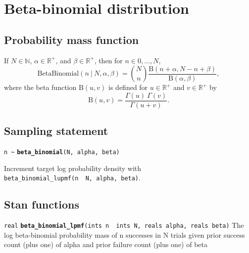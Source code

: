 \documentclass[
  10pt,
]{book}
\begin{document}
\hypertarget{beta-binomial-distribution}{%
\section{Beta-binomial distribution}\label{beta-binomial-distribution}}

\hypertarget{probability-mass-function-5}{%
\subsection{Probability mass function}\label{probability-mass-function-5}}

If \(N \in \mathbb{N}\), \(\alpha \in \mathbb{R}^+\), and \(\beta \in \mathbb{R}^+\), then for \(n \in {0,\ldots,N}\), \[
\text{BetaBinomial}(n~|~N,\alpha,\beta) = \binom{N}{n}
\frac{\mathrm{B}(n+\alpha, N -n +   \beta)}{\mathrm{B}(\alpha,\beta)},
\] where the beta function \(\mathrm{B}(u,v)\) is defined for \(u \in \mathbb{R}^+\) and \(v \in \mathbb{R}^+\) by \[ \mathrm{B}(u,v) =
\frac{\Gamma(u) \ \Gamma(v)}{\Gamma(u + v)}. \]

\hypertarget{sampling-statement-5}{%
\subsection{Sampling statement}\label{sampling-statement-5}}

\texttt{n\ \textasciitilde{}} \textbf{\texttt{beta\_binomial}}\texttt{(N,\ alpha,\ beta)}

Increment target log probability density with \texttt{beta\_binomial\_lupmf(n\ \textbar{}\ N,\ alpha,\ beta)}.

\hypertarget{stan-functions-5}{%
\subsection{Stan functions}\label{stan-functions-5}}


\texttt{real} \textbf{\texttt{beta\_binomial\_lpmf}}\texttt{(ints\ n\ \textbar{}\ ints\ N,\ reals\ alpha,\ reals\ beta)}\newline
The log beta-binomial probability mass of n successes in N trials
given prior success count (plus one) of alpha and prior failure count
(plus one) of beta

\end{document}
